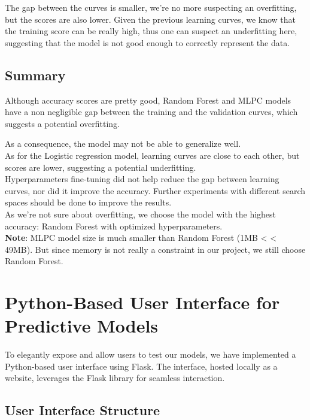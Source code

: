 \documentclass[a4paper,12pt]{article}
\begin{document}
The gap between the curves is smaller, we're no more suspecting an overfitting, but the scores are also lower. Given the previous learning curves, we know that the training score can be really high, thus one can suspect an underfitting here, suggesting that the model is not good enough to correctly represent the data.\\






\subsection{Summary}

Although accuracy scores are pretty good, Random Forest and MLPC models have a non negligible gap between the training and the validation curves, which suggests a potential overfitting.

As a consequence, the model may not be able to generalize well.\\

As for the Logistic regression model, learning curves are close to each other, but scores are lower, suggesting a potential underfitting.\\

   
Hyperparameters fine-tuning did not help reduce the gap between learning curves, nor did it improve the accuracy. Further experiments with different search spaces should be done to improve the results.\\
  
As we're not sure about overfitting, we choose the model with the highest accuracy: Random Forest with optimized hyperparameters.\\

\textbf{Note}: MLPC model size is much smaller than Random Forest (1MB < < 49MB). But since memory is not really a constraint in our project, we still choose Random Forest.

\section{Python-Based User Interface for Predictive Models}

To elegantly expose and allow users to test our models, we have implemented a Python-based user interface using Flask. The interface, hosted locally as a website, leverages the Flask library for seamless interaction.

\subsection{User Interface Structure}
\end{document}
